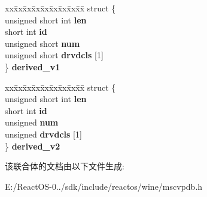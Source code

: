 \begin{DoxyCompactItemize}
\begin{tabbing}
\end{tabbing}\item 
\mbox{\label{unioncodeview__reftype_a7c7cd40161d31ad64a0a108a9e41ac03}} 
\begin{tabbing}
xx\=xx\=xx\=xx\=xx\=xx\=xx\=xx\=xx\=\kill
struct \{\\
\>unsigned short int {\bfseries len}\\
\>short int {\bfseries id}\\
\>unsigned short {\bfseries num}\\
\>unsigned short {\bfseries drvdcls} \mbox{[}1\mbox{]}\\
\} {\bfseries derived\_v1}\\

\end{tabbing}\item 
\mbox{\label{unioncodeview__reftype_a4b681de338c264a05ad1921bac2e75ad}} 
\begin{tabbing}
xx\=xx\=xx\=xx\=xx\=xx\=xx\=xx\=xx\=\kill
struct \{\\
\>unsigned short int {\bfseries len}\\
\>short int {\bfseries id}\\
\>unsigned {\bfseries num}\\
\>unsigned {\bfseries drvdcls} \mbox{[}1\mbox{]}\\
\} {\bfseries derived\_v2}\\

\end{tabbing}\end{DoxyCompactItemize}


该联合体的文档由以下文件生成\+:\begin{DoxyCompactItemize}
\item 
E\+:/\+React\+O\+S-\/0../sdk/include/reactos/wine/mscvpdb.\+h\end{DoxyCompactItemize}
